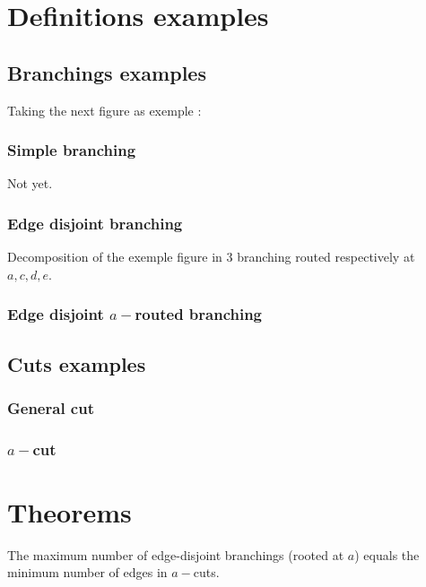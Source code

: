 \documentclass{article}
\begin{document}
\section{Definitions examples}

\subsection{Branchings examples}

Taking the next figure as exemple :


\subsubsection{Simple branching}

Not yet.


\subsubsection{Edge disjoint branching}

Decomposition of the exemple figure in 3 branching routed respectively at $a, c, d, e$.

\subsubsection{Edge disjoint $a-$routed branching}



\subsection{Cuts examples}

\subsubsection{General cut}

\subsubsection{$a-$cut}


\section{Theorems}

\begin{edmonds_theorem}[Edmonds]
The maximum number of edge-disjoint branchings (rooted at $a$) 
equals the minimum number of edges in $a-$cuts.
\end{edmonds_theorem}
\end{document}
